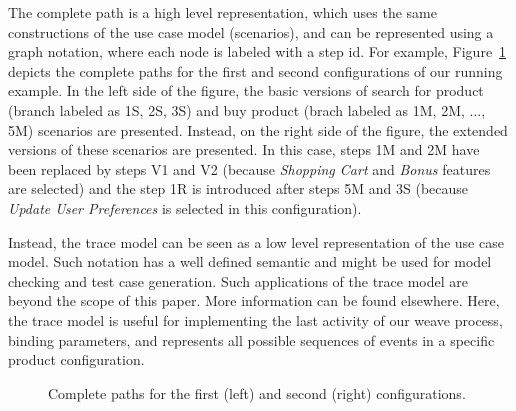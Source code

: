 \begin{enumerate}
The complete path is a high level representation, which uses the same constructions of the use case model (scenarios), and can be represented using a graph notation, where each node is labeled with a step id. For example, Figure~\ref{fig:complete-paths} depicts the complete paths for the first and second configurations of our running example. In the left side of the figure,  the basic versions of search for product (branch labeled as 1S, 2S, 3S) and buy product (brach labeled as 1M, 2M, ..., 5M) scenarios are presented. Instead, on the right side of the figure, the extended versions of these scenarios are presented. In this case, steps 1M and 2M have been replaced by steps V1 and V2 (because \emph{Shopping Cart} and \emph{Bonus} features are selected) and the step  1R is introduced after steps 5M and 3S (because \emph{Update User Preferences} is selected in this configuration).
 
Instead, the trace model can be seen as a low level representation of the use case model. Such notation has a well defined semantic and might 
be used for model checking and test case generation. Such applications of the trace model are beyond the scope of this paper. More information 
can be found elsewhere\cite{csp-hoare,csp-roscoe,cfeitosa-sbmf-2006}. Here, the trace model is useful for implementing the last activity of our weave process, binding parameters, and 
represents all possible sequences of events in a specific product configuration. 


 
\begin{figure}[t]
\begin{center}
\begin{tiny}
\begin{xy}
\end{xy}
\end{tiny}
\caption{Complete paths for the first (left) and second (right) configurations.}
\label{fig:complete-paths}
\end{center}
\end{figure}


\end{enumerate}
